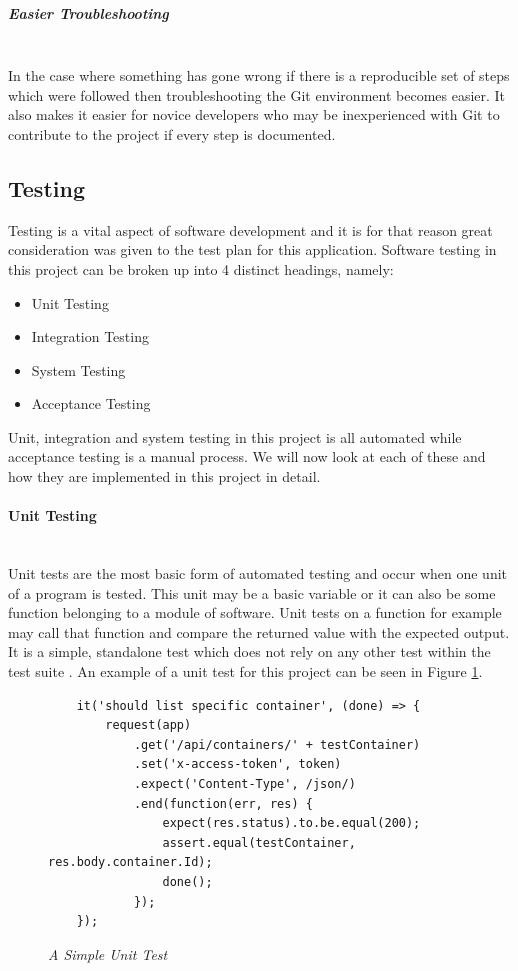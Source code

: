 \subparagraph{Easier Troubleshooting}\mbox{}\\
In the case where something has gone wrong if there is a reproducible set of steps which were followed then troubleshooting the Git environment becomes easier. It also makes it easier for novice developers who may be inexperienced with Git to contribute to the project if every step is documented.

\subsection{Testing}
\label{sub:testing}
Testing is a vital aspect of software development and it is for that reason great consideration was given to the test plan for this application. Software testing in this project can be broken up into 4 distinct headings, namely:

\begin{itemize}
	\item Unit Testing
	\item Integration Testing
	\item System Testing
	\item Acceptance Testing
\end{itemize}

Unit, integration and system testing in this project is all automated while acceptance testing is a manual process. We will now look at each of these and how they are implemented in this project in detail.

\paragraph{Unit Testing}\mbox{}\\
Unit tests are the most basic form of automated testing and occur when one unit of a program is tested. This unit may be a basic variable or it can also be some function belonging to a module of software. Unit tests on a function for example may call that function and compare the returned value with the expected output. It is a simple, standalone test which does not rely on any other test within the test suite \citep{UnitTesting2017}. An example of a unit test for this project can be seen in Figure \ref{fig:unit_test}.

\begin{figure}[!ht]
\begin{lstlisting}
	it('should list specific container', (done) => {
		request(app)
			.get('/api/containers/' + testContainer)
			.set('x-access-token', token)
			.expect('Content-Type', /json/)
			.end(function(err, res) {
				expect(res.status).to.be.equal(200);
				assert.equal(testContainer, res.body.container.Id);
				done();
			});
	}); 
\end{lstlisting}
\caption{\em A Simple Unit Test}
\label{fig:unit_test}
\end{figure}

